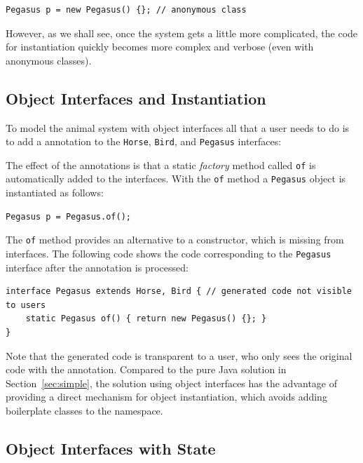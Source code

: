 \begin{lstlisting}
Pegasus p = new Pegasus() {}; // anonymous class
\end{lstlisting}

\noindent However, as we shall see, once the system gets a little more
complicated, the code for instantiation quickly becomes more
complex and verbose (even with anonymous classes).

\subsection{Object Interfaces and Instantiation}

To model the animal system with object interfaces all that a user
needs to do is to add a \mixinAnn{} annotation to the \texttt{Horse},
\texttt{Bird}, and \texttt{Pegasus} interfaces:


\noindent The effect of the annotations is that a static \emph{factory} method called
\texttt{of} is automatically added to the interfaces. With the
\texttt{of} method a \texttt{Pegasus} object is instantiated as follows:

\begin{lstlisting}
Pegasus p = Pegasus.of();
\end{lstlisting}

\noindent The \texttt{of} method provides an alternative to a
constructor, which is missing from interfaces. The following code 
shows the code corresponding to the \texttt{Pegasus} interface
after the \mixinAnn{} annotation is processed:

\begin{lstlisting}
interface Pegasus extends Horse, Bird { // generated code not visible to users
    static Pegasus of() { return new Pegasus() {}; }
}
\end{lstlisting}

\noindent Note that the generated code is transparent to a user, who 
only sees the original code with the \mixin annotation. Compared to the pure
Java solution in Section~\ref{sec:simple}, the solution using object interfaces
has the advantage of providing a direct mechanism for object
instantiation, which avoids adding boilerplate classes to the
namespace.

\subsection{Object Interfaces with State}


